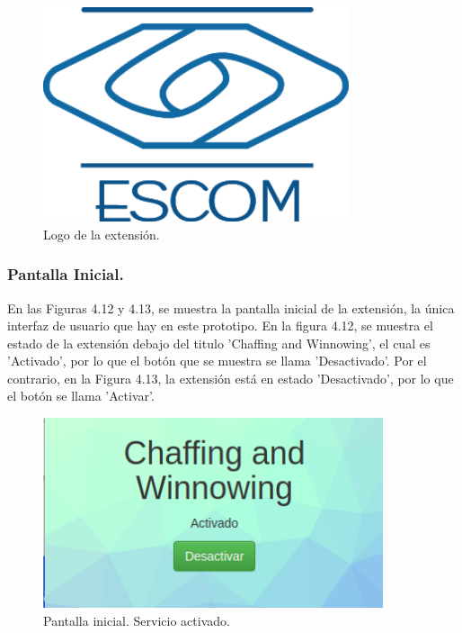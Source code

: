 \documentclass[12pt, a4paper, titlepage]{report}
\begin{document}
			    \begin{figure}[H]
					\begin{center}	\includegraphics[width=9cm]{./imagenes/Desarrollo/Prototipo_1/escom.png}
						\caption{Logo de la extensión.}
					\end{center}
				\end{figure}
				
				\subsubsection{Pantalla Inicial.}
			    En las Figuras 4.12 y 4.13, se muestra la pantalla inicial de la extensión, la única interfaz de usuario que hay en este prototipo. En la figura 4.12, se muestra el estado de la extensión debajo del titulo 'Chaffing and Winnowing', el cual es 'Activado', por lo que el botón que se muestra se llama 'Desactivado'. Por el contrario, en la Figura 4.13, la extensión está en estado 'Desactivado', por lo que el botón se llama 'Activar'.
			  
			    \begin{figure}[H]
					\begin{center}	\includegraphics[width=10cm]{./imagenes/Desarrollo/Prototipo_1/UI_activado.png}
						\caption{Pantalla inicial. Servicio activado.}
					\end{center}
				\end{figure}
				\label{UI_ACTIVADO_4.7}
				
\end{document}
